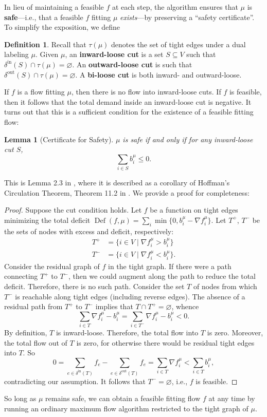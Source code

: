 \documentclass[11pt]{article}
\newtheorem{lemma}[theorem]{Lemma}
\theoremstyle{definition}
\newtheorem{definition}{Definition}[section]
\theoremstyle{definition}
\theoremstyle{definition}
\newcommand{\fu}{f^{\mu}}
\newcommand{\nfiu}{\nabla \fu_i}
\newcommand{\biu}{b_{i}^{\mu}}
\newcommand{\din}{\delta^{\text{in}}}
\newcommand{\dout}{\delta^{\text{out}}}
\DeclareMathOperator{\Def}{Def}
\begin{document}
	In lieu of maintaining a feasible $f$ at each step,
	the algorithm ensures that $\mu$ is \textbf{safe}---i.e.,
    that a feasible $f$ fitting $\mu$ \emph{exists}---by preserving a
	``safety certificate''. To simplify the exposition, we define 
	\begin{definition}
		Recall that $\tau(\mu)$ denotes the set of tight edges under a dual labeling $\mu$.
		Given $\mu$, an \textbf{inward-loose cut} is a set $S \subseteq V$ such that
		$\din(S) \cap \tau(\mu) = \varnothing$. An \textbf{outward-loose cut}
		is such that $\dout(S) \cap \tau(\mu) = \varnothing$. A \textbf{bi-loose cut}
		is both inward- and outward-loose.
	\end{definition}
	If $f$ is a flow fitting $\mu$, then there is no flow into inward-loose cuts.
	If $f$ is feasible, then it follows that the total demand inside an inward-loose
	cut is negative. It turns out that this is a sufficient condition for the existence
	of a feasible fitting flow:
	\begin{lemma}[Certificate for Safety] \label{lem.safety}
	$\mu$ is safe if and only if for any inward-loose cut $S$,
	\[ \sum_{i \in S} \biu \leq 0. \]
	\end{lemma}
	This is Lemma 2.3 in \cite{Olver2017}, where it is described as a corollary of Hoffman's Circulation
	Theorem, Theorem 11.2 in \cite{Schrijver2002}. We provide a proof for completeness:
	\begin{proof}
		Suppose the cut condition holds. Let $f$ be a function on tight edges minimizing
		the total deficit $\Def(f, \mu) = \sum_i \min\{0, \biu - \nfiu\}$. Let
		$T^+$, $T^-$ be the sets of nodes with excess and deficit, respectively:
		\begin{align*}
			T^+ &= \{i \in V \mid \nfiu > \biu \} \\
			T^- &= \{i \in V \mid \nfiu < \biu \}.
		\end{align*}
		Consider the residual graph of $f$ in the tight graph. If there were a path
		connecting $T^+$ to $T^-$, then we could augment along the path
		to reduce the total deficit. Therefore, there is no such path. Consider the
		set $T$ of nodes from which $T^-$ is reachable along tight edges (including reverse edges).
		The absence of a residual path from $T^+$ to $T^-$
        implies that $T \cap T^+ = \varnothing$, whence
		\[ \sum_{i \in T} \nfiu - \biu = \sum_{i \in T^-} \nfiu - \biu < 0. \]
		By definition, $T$ is inward-loose. Therefore, the total flow into $T$ is zero.
        Moreover, the total flow out of $T$ is zero, for otherwise there would be
        residual tight edges into $T$. So
		\[ 0 = \sum_{e \in \din(T)} f_e - \sum_{e \in \dout(T)} f_e
		     = \sum_{i \in T} \nfiu < \sum_{i \in T} \biu, \]
		contradicting our assumption. It follows that $T^- = \varnothing$, i.e., $f$
		is feasible.
	\end{proof}
    So long as $\mu$ remains safe, we can obtain a feasible fitting flow $f$ at any time
    by running an ordinary maximum flow algorithm restricted to the tight graph of $\mu$.
    
\end{document}

